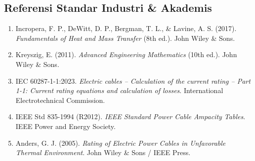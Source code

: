 \documentclass[11pt,a4paper]{article}
\theoremstyle{definition}
\begin{document}
\subsection{Referensi Standar Industri \& Akademis}
\begin{enumerate}[leftmargin=*]
    \item Incropera, F. P., DeWitt, D. P., Bergman, T. L., \& Lavine, A. S. (2017). \textit{Fundamentals of Heat and Mass Transfer} (8th ed.). John Wiley \& Sons.
    \item Kreyszig, E. (2011). \textit{Advanced Engineering Mathematics} (10th ed.). John Wiley \& Sons.
    \item IEC 60287-1-1:2023. \textit{Electric cables -- Calculation of the current rating -- Part 1-1: Current rating equations and calculation of losses}. International Electrotechnical Commission.
    \item IEEE Std 835-1994 (R2012). \textit{IEEE Standard Power Cable Ampacity Tables}. IEEE Power and Energy Society.
    \item Anders, G. J. (2005). \textit{Rating of Electric Power Cables in Unfavorable Thermal Environment}. John Wiley \& Sons / IEEE Press.
\end{enumerate}
\end{document}
